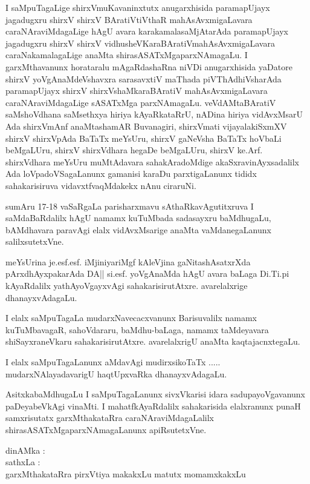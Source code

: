 I saMpuTagaLige shirxVmuKavaninxtutx anugarxhisida paramapUjayx jagadugxru shirxV shirxV BAratiVtiVthaR mahAsAvxmigaLavara caraNAraviMdagaLige hAgU avara karakamalasaMjAtarAda paramapUjayx jagadugxru shirxV shirxV vidhusheVKaraBAratiV\break mahAsAvxmigaLavara caraNakamalagaLige anaMta shirasASATxMgaparxNAmagaLu. I garxMthavanunx horataralu mAgaRdashaRna niVDi anugarxhisida yaDatore shirxV yoVgAnaMdeVshavxra sarasavxtiV maThada piVThAdhiVsharAda paramapUjayx shirxV shirxV\break shaMkaraBAratiV mahAsAvxmigaLavara caraNAraviMdagaLige sASATxMga parxNAmagaLu. veVdAMtaBAratiV saMshoVdhana saMsethxya hiriya kAyaRkataRrU, nADina hiriya vidAvxMsarU Ada shirxVmAnf anaMtashamAR Buvanagiri, shirxVmati vijayalakiSxmXV shirxV shirxVpAda BaTaTx meYsUru, shirxV gaNeVsha BaTaTx hoVbaLi beMgaLUru, shirxV shirxVdhara hegaDe beMgaLUru, shirxV ke.Arf. shirxVdhara meYsUru muMtAdavara sahakAradoMdige akaSxravinAyxsadalilx Ada loVpadoVSagaLanunx gamanisi karaDu parxtigaLanunx tididx sahakarisiruva vidavxtfvaqMdakekx nAnu ciraruNi. 

sumAru 17-18 vaSaRgaLa parisharxmavu sAthaRkavAgutitxruva I saMdaBaRdalilx hAgU namamx kuTuMbada sadasayxru baMdhugaLu, bAMdhavara paravAgi elalx vidAvxMsarige anaMta vaMdanegaLanunx salilxsutetxVne. 

meYsUrina je.esf.esf. iMjiniyariMgf kAleVjina gaNitashAsatxrXda pArxdhAyxpakarAda DA|| si.esf. yoVgAnaMda hAgU avara baLaga Di.Ti.pi kAyaRdalilx yathAyoVgayxvAgi sahakarisirutAtxre. avarelalxrige dhanayxvAdagaLu. 

I elalx saMpuTagaLa mudarxNavecacxvanunx Barisuvalilx namamx kuTuMbavagaR, sahoVdararu, baMdhu-baLaga, namamx taMdeyavara shiSayxraneVkaru sahakarisirutAtxre. avarelalxrigU anaMta kaqtajacnxtegaLu. 

I elalx saMpuTagaLanunx aMdavAgi mudirxsikoTaTx ..... mudarxNAlayadavarigU haqtUpxvaRka dhanayxvAdagaLu.

AsitxkabaMdhugaLu I saMpuTagaLanunx sivxVkarisi idara sadupayoVgavanunx paDeyabeVkAgi vinaMti. I mahatfkAyaRdalilx sahakarisida elalxranunx punaH samxrisutatx garxMthakataRra caraNAraviMdagaLalilx shirasASATxMgaparxNAmagaLanunx apiRsutetxVne.

\bigskip

\noindent dinAMka : \\
sathxLa : \\
garxMthakataRra pirxVtiya makakxLu matutx momamxkakxLu
